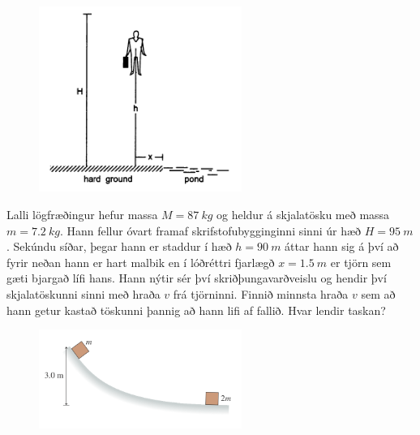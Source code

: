 \begin{enumerate}[label = \textbf{Dæmi \thechapter.\arabic*.}]
\vspace{0.3cm}

\begin{minipage}{\linewidth}
\begin{figure}
\centering
\vspace{-0.5cm}
\includegraphics[width=2.6in]{images/pond.png}
   \label{fig:amypond}
\end{figure}

\item Lalli lögfræðingur hefur massa $M = \SI{87}{kg}$ og heldur á skjalatösku með massa $m = \SI{7.2}{kg}$. Hann fellur óvart framaf skrifstofubygginginni sinni úr hæð $H = \SI{95}{m}$. Sekúndu síðar, þegar hann er staddur í hæð $h = \SI{90}{m}$ áttar hann sig á því að fyrir neðan hann er hart malbik en í lóðréttri fjarlægð $x = \SI{1.5}{m}$ er tjörn sem gæti bjargað lífi hans. Hann nýtir sér því skriðþungavarðveislu og hendir því skjalatöskunni sinni með hraða $v$ 
frá tjörninni. Finnið minnsta hraða $v$ sem að hann getur kastað töskunni þannig að hann lifi af fallið. Hvar lendir taskan?

\end{minipage}

\newpage



\begin{minipage}{\linewidth}
\begin{figure}
\centering
\vspace{-1cm}
\includegraphics[width=2.6in]{images/skab.png}
   \label{fig:vifilfell}
\end{figure}


\end{minipage}
\end{enumerate}
